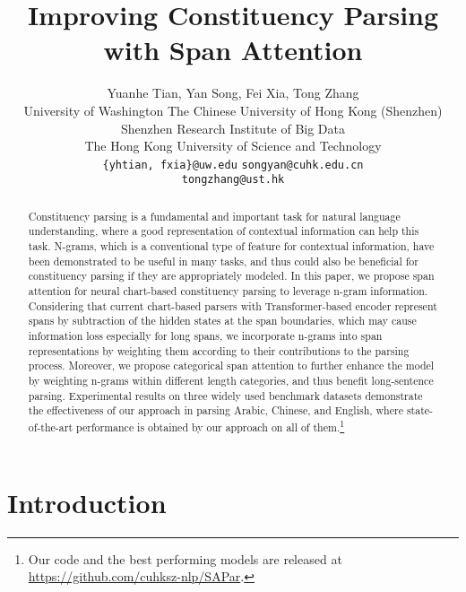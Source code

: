 \documentclass[11pt,a4paper]{article}
\title{Improving Constituency Parsing with Span Attention}
\author{
    Yuanhe Tian, \hspace{0.2cm}
    Yan Song, \hspace{0.2cm}
    Fei Xia, \hspace{0.2cm}
    Tong Zhang \\
University of Washington \hspace{0.4cm}
The Chinese University of Hong Kong (Shenzhen)\\
    Shenzhen Research Institute of Big Data \\
    The Hong Kong University of Science and Technology\\
\texttt{\{yhtian, fxia\}@uw.edu} \hspace{0.4cm} 
    \texttt{songyan@cuhk.edu.cn} \\
    \texttt{tongzhang@ust.hk} \hspace{0.4cm}
}
\date{}
\begin{document}
\maketitle


\renewcommand{\thefootnote}{\fnsymbol{footnote}}

\renewcommand{\thefootnote}{\arabic{footnote}}


\begin{abstract}


Constituency parsing is a fundamental and important task for natural language understanding, 
where a good representation of contextual information can help this task.
N-grams, which is a conventional type of feature for contextual information, have been demonstrated to be useful in many tasks, and thus could also be beneficial for constituency parsing if they are appropriately modeled.
In this paper, we propose span attention for neural chart-based constituency parsing to leverage n-gram information.
Considering that current chart-based parsers with Transformer-based encoder represent spans by subtraction of the hidden states at the span boundaries, which may cause information loss especially for long spans, we incorporate n-grams into span representations by weighting them according to their contributions to the parsing process.
Moreover, we propose categorical span attention to further enhance the model
by weighting n-grams within different length categories,
and thus benefit long-sentence parsing.
Experimental results on three widely used benchmark datasets demonstrate the effectiveness of our approach in parsing 
Arabic, Chinese, and English, where state-of-the-art performance is obtained by our approach on all of them.\footnote{Our code and the best performing models are released at \url{https://github.com/cuhksz-nlp/SAPar}.}


\end{abstract}


\section{Introduction}
\label{intro}
\end{document}
